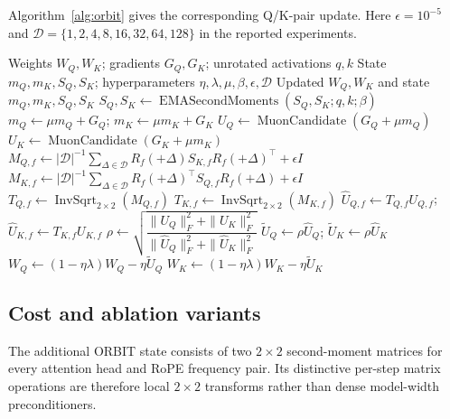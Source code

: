 \medskip
Algorithm~\ref{alg:orbit} gives the corresponding Q/K-pair update. Here
$\epsilon=10^{-5}$ and $\mathcal D=\{1,2,4,8,16,32,64,128\}$ in the reported experiments.

\begin{algorithm}[!htbp]
\caption{ORBIT update for a RoPE query--key projection pair}
\label{alg:orbit}
\begin{algorithmic}[1]
\Require Weights $W_Q,W_K$; gradients $G_Q,G_K$; unrotated activations $q,k$
\Require State $m_Q,m_K,S_Q,S_K$; hyperparameters $\eta,\lambda,\mu,\beta,\epsilon,\mathcal D$
\Ensure Updated $W_Q,W_K$ and state $m_Q,m_K,S_Q,S_K$
\State $S_Q,S_K \gets \operatorname{EMASecondMoments}(S_Q,S_K;q,k;\beta)$
\State $m_Q \gets \mu m_Q + G_Q$; \quad $m_K \gets \mu m_K + G_K$
\State $U_Q \gets \operatorname{MuonCandidate}(G_Q+\mu m_Q)$
\State $U_K \gets \operatorname{MuonCandidate}(G_K+\mu m_K)$
    \State $M_{Q,f} \gets |\mathcal D|^{-1}\!\sum_{\Delta\in\mathcal D}
    R_f(+\Delta)S_{K,f}R_f(+\Delta)^\top+\epsilon I$
    \State $M_{K,f} \gets |\mathcal D|^{-1}\!\sum_{\Delta\in\mathcal D}
    R_f(+\Delta)^\top S_{Q,f}R_f(+\Delta)+\epsilon I$
    \State $T_{Q,f} \gets \operatorname{InvSqrt}_{2\times2}(M_{Q,f})$
    \State $T_{K,f} \gets \operatorname{InvSqrt}_{2\times2}(M_{K,f})$
    \State $\widehat U_{Q,f} \gets T_{Q,f}U_{Q,f}$; \quad
    $\widehat U_{K,f} \gets T_{K,f}U_{K,f}$
\EndFor
\State $\rho \gets
\sqrt{\dfrac{\|U_Q\|_F^2+\|U_K\|_F^2}
{\|\widehat U_Q\|_F^2+\|\widehat U_K\|_F^2}}$
\State $\widetilde U_Q \gets \rho\widehat U_Q$; \quad
$\widetilde U_K \gets \rho\widehat U_K$
\State $W_Q \gets (1-\eta\lambda)W_Q-\eta\widetilde U_Q$
\State $W_K \gets (1-\eta\lambda)W_K-\eta\widetilde U_K$
\end{algorithmic}
\end{algorithm}
\FloatBarrier

\subsection{Cost and ablation variants}
The additional ORBIT state consists of two $2\times2$ second-moment matrices for every
attention head and RoPE frequency pair. Its distinctive per-step matrix operations are
therefore local $2\times2$ transforms rather than dense model-width preconditioners.

